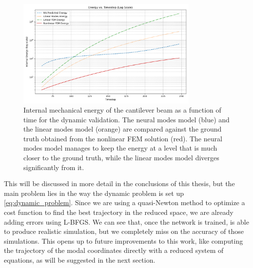 \begin{figure}[htb]
    \centering
    \includegraphics[width=0.8\textwidth]{Images/beam_dynamic_energy.png}
    \caption{Internal mechanical energy of the cantilever beam as a function of time for the dynamic validation. The neural modes model (blue) and the linear modes model (orange) are compared against the ground truth obtained from the nonlinear FEM solution (red). The neural modes model manages to keep the energy at a level that is much closer to the ground truth, while the linear modes model diverges significantly from it.}
    \label{fig:dynamic_validation_energy_comparison}
    \end{figure}

This will be discussed in more detail in the conclusions of this thesis, but the main problem lies in the way the dynamic problem is set up \eqref{eq:dynamic_problem}. Since we are using a quasi-Newton method to optimize a cost function to find the best trajectory in the reduced space, we are already adding errors using L-BFGS. We can see that, once the network is trained, is able to produce realistic simulation, but we completely miss on the accuracy of those simulations. This opens up to future improvements to this work, like computing the trajectory of the modal coordinates directly with a reduced system of equations, as will be suggested in the next section.


\FloatBarrier %